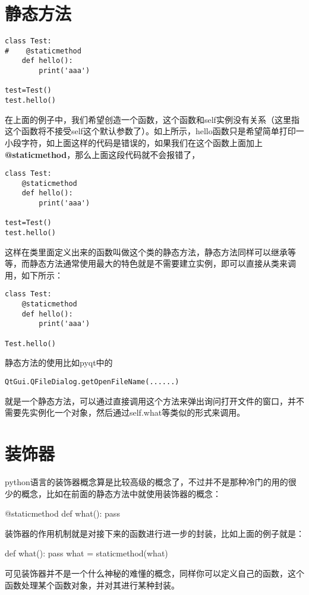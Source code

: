 \documentclass[12pt,oneside]{book}
\begin{document}
\begin{common-format}
\section{静态方法}
\begin{Verbatim}
class Test:
#    @staticmethod
    def hello():
        print('aaa')

test=Test()
test.hello()
\end{Verbatim}
在上面的例子中，我们希望创造一个函数，这个函数和self实例没有关系（这里指这个函数将不接受self这个默认参数了）。如上所示，hello函数只是希望简单打印一小段字符，如上面这样的代码是错误的，如果我们在这个函数上面加上\textbf{@staticmethod}，那么上面这段代码就不会报错了，

\begin{Verbatim}
class Test:
    @staticmethod
    def hello():
        print('aaa')

test=Test()
test.hello()
\end{Verbatim}
这样在类里面定义出来的函数叫做这个类的静态方法，静态方法同样可以继承等等，而静态方法通常使用最大的特色就是不需要建立实例，即可以直接从类来调用，如下所示：
\begin{Verbatim}
class Test:
    @staticmethod
    def hello():
        print('aaa')

Test.hello()
\end{Verbatim}

静态方法的使用比如pyqt中的
\begin{Verbatim}
QtGui.QFileDialog.getOpenFileName(......)
\end{Verbatim}
就是一个静态方法，可以通过直接调用这个方法来弹出询问打开文件的窗口，并不需要先实例化一个对象，然后通过self.what等类似的形式来调用。



\section{装饰器}
python语言的装饰器概念算是比较高级的概念了，不过并不是那种冷门的用的很少的概念，比如在前面的静态方法中就使用装饰器的概念：
\begin{tcbpython}[]
    @staticmethod
    def what():
        pass
\end{tcbpython}


装饰器的作用机制就是对接下来的函数进行进一步的封装，比如上面的例子就是：
\begin{tcbpython}[]
    def what():
        pass
    what = staticmethod(what)
\end{tcbpython}

可见装饰器并不是一个什么神秘的难懂的概念，同样你可以定义自己的函数，这个函数处理某个函数对象，并对其进行某种封装。


\end{common-format}
\end{document}
